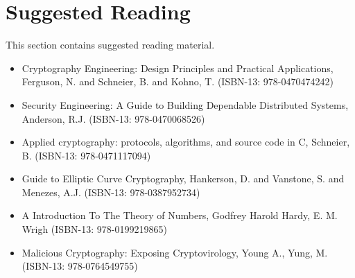 \chapter{Suggested Reading}
\label{cha:suggested-reading}
This section contains suggested reading material.

\begin{itemize}
	\item Cryptography Engineering: Design Principles and Practical Applications, Ferguson, N. and Schneier, B. and Kohno, T. (ISBN-13: 978-0470474242)
	\item Security Engineering: A Guide to Building Dependable Distributed Systems, Anderson, R.J. (ISBN-13: 978-0470068526)
	\item Applied cryptography: protocols, algorithms, and source code in C, Schneier, B. (ISBN-13: 978-0471117094)
	\item Guide to Elliptic Curve Cryptography, Hankerson, D. and Vanstone, S. and Menezes, A.J. (ISBN-13: 978-0387952734)
	\item A Introduction To The Theory of Numbers, Godfrey Harold Hardy, E. M. Wrigh (ISBN-13: 978-0199219865)
	\item Malicious Cryptography: Exposing Cryptovirology, Young A., Yung, M. (ISBN-13: 978-0764549755)
\end{itemize}

